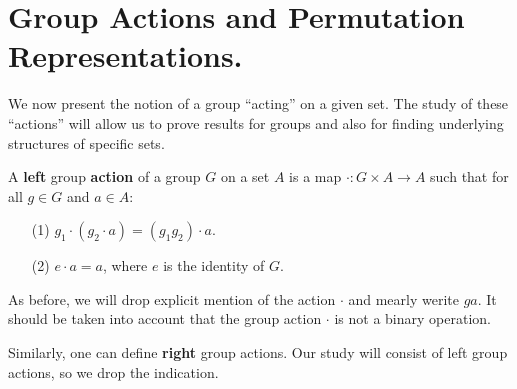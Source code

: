 \section{Group Actions and Permutation Representations.}

We now present the notion of a group ``acting'' on a given set. The study of
these ``actions'' will allow us to prove results for groups and also for finding
underlying structures of specific sets.

\begin{definition}
    A \textbf{left} group \textbf{action} of a group $G$ on a set  $A$ is a map
    $\cdot: G \times A
    \rightarrow A$ such that for all $g \in G$ and  $a \in A$:
    \begin{enumerate}
        \item[(1)] $g_1 \cdot (g_2 \cdot a)=(g_1g_2) \cdot a$.

        \item[(2)] $e \cdot a=a$, where  $e$ is the identity of  $G$.
    \end{enumerate}
\end{definition}
\begin{remark}
    As before, we will drop explicit mention of the action $\cdot$ and mearly
    werite $ga$. It should be taken into account that the group action $\cdot$
    is not a binary operation.
\end{remark}
\begin{remark}
    Similarly, one can define \textbf{right} group actions. Our study will
    consist of left group actions, so we drop the indication.
\end{remark}

